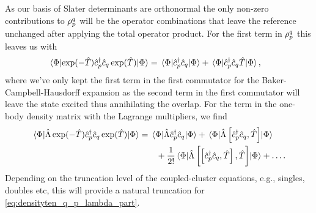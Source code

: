     As our basis of Slater determinants are orthonormal the only non-zero
    contributions to $\rho^q_p$ will be the operator combinations that
    leave the reference unchanged after applying the total operator product.
    For the first term in $\rho^q_p$ this leaves us with
    \begin{align}
        \mel*{\slat}{
            \exponential(-\clust)
            \ccr{p}\can{q}
            \exponential(\clust)
        }{\slat}
        &= \mel*{\slat}{
            \ccr{p}\can{q}
        }{\slat}
        + \mel*{\slat}{
            \ccr{p}\can{q}\clust
        }{\slat},
    \end{align}
    where we've only kept the first term in the first commutator for the
    Baker-Campbell-Hausdorff expansion as the second term in the first
    commutator will leave the state excited thus annihilating the overlap.
    For the term in the one-body density matrix with the Lagrange multipliers,
    we find
    \begin{align}
        \mel*{\slat}{
            \clustl
            \exponential(-\clust)
            \ccr{p}\can{q}
            \exponential(\clust)
        }{\slat}
        &= \mel*{\slat}{
            \clustl
            \ccr{p}\can{q}
        }{\slat}
        + \mel*{\slat}{
            \clustl
            \com{\ccr{p}\can{q}}{\clust}
        }{\slat}
        \nonumber \\
        &\qquad
        + \frac{1}{2!}
        \mel*{\slat}{
            \clustl
            \com{\com{\ccr{p}\can{q}}{\clust}}{\clust}
        }{\slat}
        + \dots.
        \label{eq:densityten_q_p_lambda_part}
    \end{align}
    Depending on the truncation level of the coupled-cluster equations, e.g.,
    singles, doubles etc, this will provide a natural truncation for
    \autoref{eq:densityten_q_p_lambda_part}.

